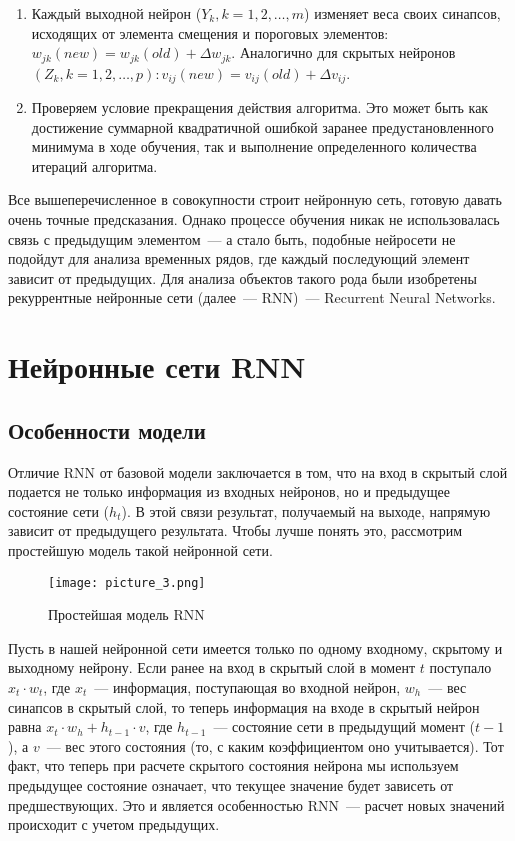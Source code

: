 \documentclass[12pt, a4paper]{article}
\begin{document}
\begin{enumerate}
		\item	Каждый выходной нейрон ($Y_k, k = 1, 2, …, m$) изменяет веса своих синапсов, исходящих от элемента смещения и пороговых элементов: $w_{jk}(new) = w_{jk}(old) + \Delta w_{jk}$. Аналогично для скрытых нейронов $(Z_k, k = 1, 2, …, p): v_{ij}(new) = v_{ij}(old) + \Delta v_{ij}$.
		\item	Проверяем условие прекращения действия алгоритма. Это может быть как достижение суммарной квадратичной ошибкой заранее предустановленного минимума в ходе обучения, так и выполнение определенного количества итераций алгоритма.
\end{enumerate}

\renewcommand{\labelenumi}{\arabic{enumi})}

Все вышеперечисленное в совокупности строит нейронную сеть, готовую давать очень точные предсказания. Однако процессе обучения никак не использовалась связь с предыдущим элементом~--- а стало быть, подобные нейросети не подойдут для анализа временных рядов, где каждый последующий элемент зависит от предыдущих. Для анализа объектов такого рода были изобретены рекуррентные нейронные сети (далее~--- RNN)~--- Recurrent Neural Networks.

\section{Нейронные сети RNN}

\subsection{Особенности модели}

Отличие RNN от базовой модели заключается в том, что на вход в скрытый слой подается не только информация из входных нейронов, но и предыдущее состояние сети ($h_t$). В этой связи результат, получаемый на выходе, напрямую зависит от предыдущего результата. Чтобы лучше понять это, рассмотрим простейшую модель такой нейронной сети. \\

\begin{wrapfigure}{r}{0.35\textwidth}
    \centering
    \texttt{[image: picture\_3.png]}
		\caption{Простейшая модель RNN}
\end{wrapfigure}

Пусть в нашей нейронной сети имеется только по одному входному, скрытому и выходному нейрону. Если ранее на вход в скрытый слой в момент $t$ поступало $x_t \cdot w_t$, где $x_t$~--- информация, поступающая во входной нейрон, $w_h$~--- вес синапсов в скрытый слой, то теперь информация на входе в скрытый нейрон равна $x_t \cdot w_h + h_{t-1} \cdot v$, где $h_{t-1}$~--- состояние сети в предыдущий момент ($t - 1$), а $v$~--- вес этого состояния (то, с каким коэффициентом оно учитывается).
Тот факт, что теперь при расчете скрытого состояния нейрона мы используем предыдущее состояние означает, что текущее значение будет зависеть от предшествующих. Это и является особенностью RNN~--- расчет новых значений происходит с учетом предыдущих.
\end{document}

